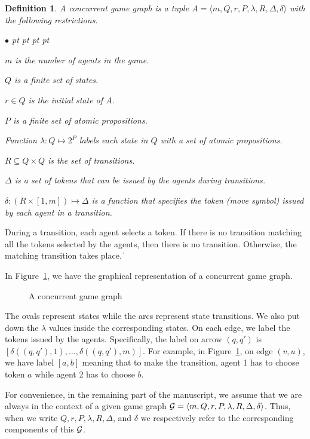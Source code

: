\documentclass[11pt]{article}
\newtheorem{definition}{Definition}
\newcommand{\calg}{{\cal G}}
\def\qed{\ifmmode\|\else{\unskip\nobreak\hfil
\penalty50\hskip1em\null\nobreak\hfil$\blacksquare$
\parfillskip=0pt\finalhyphendemerits=0\endgraf}\fi}
\newenvironment{list1}{\begin{list}{$\bullet$}
{\topsep 0 pt \parsep 0 pt \partopsep 0 pt \itemsep 0 pt}}{\end{list}}
\begin{document}
\begin{definition}
A concurrent game graph is a tuple 
$A=\langle m,Q,r,P,\lambda,R,\Delta,\delta\rangle$
with the following restrictions.
\begin{list1}
\item 
	$m$ is the number of agents in the game.
\item 
	$Q$ is a finite set of states.
\item 
	$r\in Q$ is the {\em initial state} of $A$.
\item 
	$P$ is a finite set of atomic propositions.
\item Function 
	$\lambda:Q\mapsto 2^P$ labels each 
	state in $Q$ with a set of atomic propositions.
\item 
	$R\subseteq Q\times Q$ is the set of transitions.
\item 
	$\Delta$ is a set of tokens that can be issued 
	by the agents during transitions.  
\item 
	$\delta:(R\times [1,m])\mapsto \Delta$ is a function that specifies the
    token (move symbol) issued by each agent in a transition.
\end{list1}
\end{definition} 
During a transition, each agent selects a token.  
If there is no transition matching all the tokens selected by the agents, 
then there is no transition.  
Otherwise, the matching transition takes place.  
\qed 


In Figure~\ref{fig.cg}, we have the graphical representation of a concurrent game graph.  
\begin{figure}[!ht]
\begin{center}
\end{center}
\caption{A concurrent game graph}
\label{fig.cg}
\end{figure} 
The ovals represent states while the arcs represent 
state transitions.  
We also put down the $\lambda$ values inside the corresponding states. 
On each edge, we label the tokens issued by the agents. 
Specifically, the label on arrow $(q,q')$ is 
$[\delta((q,q'),1),\ldots,\delta((q,q'),m)]$.  
For example, in Figure~\ref{fig.cg}, 
on edge $(v,u)$, we have label $[a,b]$ meaning that 
to make the transition, agent 1 has to choose token $a$ while 
agent 2 has to choose $b$.  



\label{reply2.calp} 
For convenience, in the remaining part of the 
manuscript, we assume that we are always in the context 
of a given game graph
$\calg=\langle m,Q,r,P,\lambda,R,\Delta,\delta\rangle$.
Thus, when we write $Q,r,P,\lambda,R,\Delta$, and $\delta$ 
we respectively refer to the corresponding components of this $\calg$.  
\end{document}
